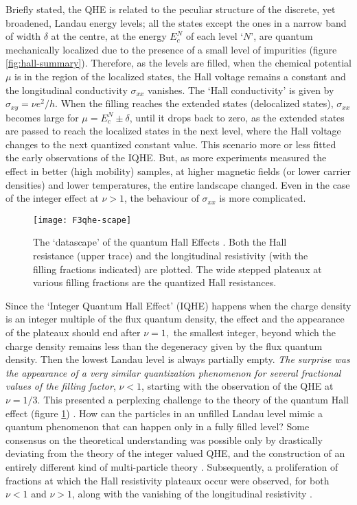 \documentclass[aps,preprint,12pt,tightenlines]{revtex4}%
\begin{document}
Briefly stated, the QHE is related to the peculiar structure of the discrete,
yet broadened, Landau energy levels; all the states except the ones in a
narrow band of width $\delta$ at the centre, at the energy $E_{c}^{N}$ of each
level `$N$', are quantum mechanically localized due to the presence of a small
level of impurities (figure \ref{fig:hall-summary}). Therefore, as the levels are
filled, when the chemical potential $\mu$ is in the region of the localized
states, the Hall voltage remains a constant and the longitudinal conductivity
$\sigma_{xx}$ vanishes. The `Hall conductivity' is given by $\sigma_{xy}=\nu
e^{2}/h$. When the filling reaches the extended states (delocalized states),
$\sigma_{xx}$ becomes large for $\mu=E_{c}^{N}\pm\delta$, until it drops back
to zero, as the extended states are passed to reach the localized states in
the next level, where the Hall voltage changes to the next quantized constant
value. This scenario more or less fitted the early observations of the IQHE.
But, as more experiments measured the effect in better (high mobility)
samples, at higher magnetic fields (or lower carrier densities) and lower
temperatures, the entire landscape changed. Even in the case of the integer
effect at $\nu>1$, the behaviour of $\sigma_{xx}$ is more complicated.

\begin{figure}
	\centering
	\texttt{[image: F3qhe-scape]}
	\caption{The `datascape' of the quantum Hall Effects \cite{Willett-1987}. Both the Hall resistance (upper trace) and the longitudinal resistivity (with the filling fractions indicated) are plotted. The wide stepped plateaux at various filling fractions are the quantized Hall resistances.}
	\label{fig:qhe-scape}
\end{figure}


Since the `Integer Quantum Hall Effect' (IQHE) happens when the charge density
is an integer multiple of the flux quantum density, the effect and the
appearance of the plateaux should end after $\nu=1,$ the smallest integer,
beyond which the charge density remains less than the degeneracy given by the
flux quantum density. Then the lowest Landau level is always partially empty. \emph{The surprise was the appearance of a very similar
quantization phenomenon for several fractional values of the filling factor}, $\nu<1$,
starting with the observation of the QHE at $\nu=1/3$. This presented a
perplexing challenge to the theory of the quantum Hall effect (figure
\ref{fig:qhe-scape}) \cite{FQHE-discovery}. How can the particles in an unfilled Landau level mimic a quantum phenomenon that can happen only in a fully filled level?  Some consensus on the theoretical understanding was possible
only by drastically deviating from the theory of the integer valued QHE, and
the construction of an entirely different kind of multi-particle theory
\cite{Laughlin-Nobel}. Subsequently, a proliferation of
fractions at which the Hall resistivity plateaux occur were observed, for both
$\nu<1$ and $\nu>1$, along with the vanishing of the longitudinal resistivity
\cite{FQHE-rev1}.
\end{document}
